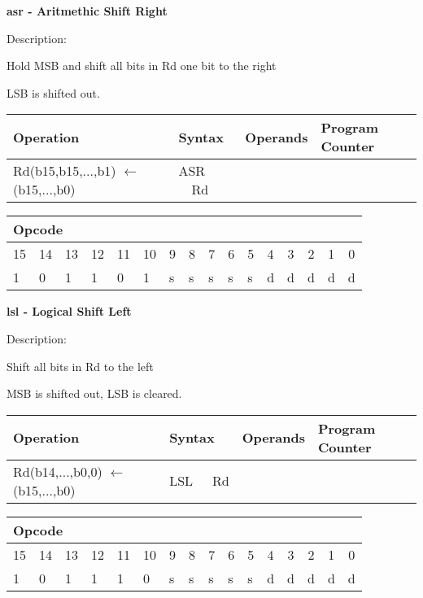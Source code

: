 \documentclass{article}
\begin{document}
\bigskip

\textbf{asr - Aritmethic Shift Right}

Description:

Hold MSB and shift all bits in Rd one bit to the right

LSB is shifted out.

\begin{tabular}{|l|l|l|l|}
\hline
Operation & Syntax & Operands & Program Counter \\ \hline
Rd(b15,b15,...,b1) $\leftarrow $ (b15,...,b0) & ASR \ \ Rd &  &  \\ \hline
\end{tabular}

\begin{tabular}{|c|c|c|c|c|c|c|c|c|c|c|c|c|c|c|c|}
\hline
\multicolumn{6}{|l|}{Opcode} & \multicolumn{5}{|l|}{} & \multicolumn{5}{|l|}{
} \\ \hline
15 & 14 & 13 & 12 & 11 & 10 & 9 & 8 & 7 & 6 & 5 & 4 & 3 & 2 & 1 & 0 \\ \hline
\multicolumn{1}{|l|}{1} & \multicolumn{1}{|l|}{0} & \multicolumn{1}{|l|}{1}
& \multicolumn{1}{|l|}{1} & \multicolumn{1}{|l|}{0} & \multicolumn{1}{|l|}{1}
& \multicolumn{1}{|l|}{s} & \multicolumn{1}{|l|}{s} & \multicolumn{1}{|l|}{s}
& \multicolumn{1}{|l|}{s} & \multicolumn{1}{|l|}{s} & \multicolumn{1}{|l|}{d}
& \multicolumn{1}{|l|}{d} & \multicolumn{1}{|l|}{d} & \multicolumn{1}{|l|}{d}
& \multicolumn{1}{|l|}{d} \\ \hline
\end{tabular}

\bigskip

\textbf{lsl - Logical Shift Left}

Description:

Shift all bits in Rd to the left

MSB is shifted out, LSB is cleared.

\begin{tabular}{|l|l|l|l|}
\hline
Operation & Syntax & Operands & Program Counter \\ \hline
Rd(b14,...,b0,0) $\leftarrow $ (b15,...,b0) & LSL\ \ \ Rd &  &  \\ \hline
\end{tabular}

\begin{tabular}{|c|c|c|c|c|c|c|c|c|c|c|c|c|c|c|c|}
\hline
\multicolumn{6}{|l|}{Opcode} & \multicolumn{5}{|l|}{} & \multicolumn{5}{|l|}{
} \\ \hline
15 & 14 & 13 & 12 & 11 & 10 & 9 & 8 & 7 & 6 & 5 & 4 & 3 & 2 & 1 & 0 \\ \hline
\multicolumn{1}{|l|}{1} & \multicolumn{1}{|l|}{0} & \multicolumn{1}{|l|}{1}
& \multicolumn{1}{|l|}{1} & \multicolumn{1}{|l|}{1} & \multicolumn{1}{|l|}{0}
& \multicolumn{1}{|l|}{s} & \multicolumn{1}{|l|}{s} & \multicolumn{1}{|l|}{s}
& \multicolumn{1}{|l|}{s} & \multicolumn{1}{|l|}{s} & \multicolumn{1}{|l|}{d}
& \multicolumn{1}{|l|}{d} & \multicolumn{1}{|l|}{d} & \multicolumn{1}{|l|}{d}
& \multicolumn{1}{|l|}{d} \\ \hline
\end{tabular}
\end{document}
